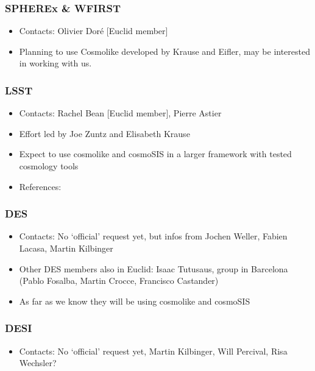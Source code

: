 \subsubsection{SPHEREx \& WFIRST}

\begin{itemize}
\item Contacts: Olivier Dor\'e  [Euclid member]
\item Planning to use Cosmolike developed by Krause and Eifler, may be interested in working with us.
\end{itemize}



\subsubsection{LSST}

\begin{itemize}
\item Contacts: Rachel Bean [Euclid member], Pierre Astier
\item Effort led by Joe Zuntz and Elisabeth Krause
\item Expect to use cosmolike and cosmoSIS in a larger framework with tested cosmology tools
\item References: 
\end{itemize}



\subsubsection{DES}

\begin{itemize}
\item Contacts: No ‘official’ request yet, but infos from Jochen Weller, Fabien Lacasa, Martin Kilbinger
\item Other DES members also in Euclid: Isaac Tutusaus, group in Barcelona (Pablo Fosalba, Martin Crocce, Francisco Castander)
\item As far as we know they will be using cosmolike and cosmoSIS
\end{itemize}



\subsubsection{DESI}

\begin{itemize}
\item Contacts: No ‘official’ request yet, Martin Kilbinger, Will Percival, Risa Wechsler?
\end{itemize}




